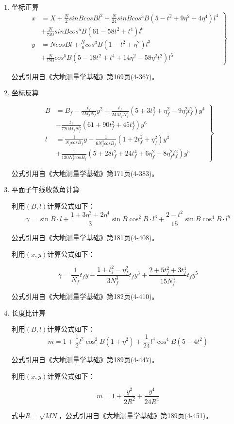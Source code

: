 \begin{enumerate}
\item 坐标正算
\begin{equation}
\left .
\begin{aligned}
x&=X+\frac{N}{2}sinBcosBl^2 +\frac{N}{24}sinBcos^3B(5-t^2 +9\eta^2+4\eta^4)l^4 \\
  &+\frac{N}{720}sinBcos^5 B(61-58t^2 +t^4)l^6  \\
y&=NcosBl+\frac{N}{6}cos^3 B(1-t^2 +\eta^2 )l^3 \\
        &+\frac{N}{120}cos^5 B (5-18t^2+t^4 +14\eta^2 -58\eta^2t^2)l^5
\end{aligned}
 \right \}
\end{equation}

公式引用自《大地测量学基础》第169页(4-367)。

\item 坐标反算

\begin{equation}
\left  .
\begin{aligned}
B&=B_f - \frac{t_f}{2M_f N_f }y^2 +\frac{t_f}{24 M_f N_f ^3}
(5 + 3t_f ^2  + \eta_f ^2 - 9\eta_f ^2 t_f^2)y^4 \\
 &- \frac{t_f}{720 M_f N_f ^5}(61 + 90t_f ^2 + 45t_f ^4)y^6 \\
l&=\frac{1}{N_f cosB_f}y - \frac{1}{6N_f ^3 cosB_f}(1 + 2t_f ^2 + \eta_f ^2)y^3  \\
 &+ \frac{1}{120N_f ^5 cosB_f}(5 + 28t_f ^2 + 24t_f ^4 + 6\eta_f ^2 +8\eta_f ^2 t_f ^2)y^5
\end{aligned} 
\right \}
\end{equation}

公式引用自《大地测量学基础》第171页(4-383)。


\item 平面子午线收敛角计算

利用$(B, l)$计算公式如下：
$$\gamma = \sin B \cdot l + \frac{1 + 3 \eta^2 + 2 \eta^4}{3} \sin B \cos ^2 B \cdot l^3
+ \frac{2 - t^2}{15}\sin B \cos ^4 B \cdot l^5$$

公式引用自《大地测量学基础》第181页(4-408)。

利用$(x, y)$计算公式如下：

$$\gamma = \frac{1}{N_f}t_f y - \frac{1+t_f ^2 - \eta_f ^2}{3N_f ^3}t_f y^3
+ \frac{2+5t_f^2+3t_f^4}{15N_f ^5}t_fy^5$$

公式引用自《大地测量学基础》第182页(4-410)。

\item 长度比计算

利用$(B, l)$计算公式如下：
$$m=1+\frac{1}{2}l^2 \cos ^2 B(1+\eta^2) + \frac{1}{24}l^4\cos ^4 B(5-4t^2)$$

公式引用自《大地测量学基础》第189页(4-447)。

利用$(x, y)$计算公式如下：

$$m=1+\frac{y^2}{2R^2} + \frac{y^4}{24R^4}$$

式中$R=\sqrt{MN}$，公式引用自《大地测量学基础》第189页(4-451)。

\end{enumerate}

